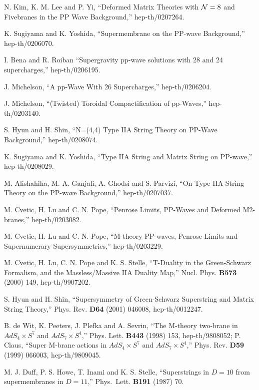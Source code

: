 \documentclass[a4paper,12pt]{article}
\begin{document}
\begin{thebibliography}{99}
 N. Kim, K. M. Lee and P. Yi, ``Deformed Matrix
  Theories with ${\cal N}=8$ and Fivebranes in the PP Wave
  Background,'' hep-th/0207264.

 K. Sugiyama and K. Yoshida, ``Supermembrane on the
  PP-wave Background,'' hep-th/0206070.

 I. Bena and R. Roiban ``Supergravity pp-wave
  solutions with 28 and 24 supercharges,'' hep-th/0206195.

 J. Michelson, ``A pp-Wave With 26 Supercharges,''
  hep-th/0206204.

 J. Michelson, ``(Twisted) Toroidal Compactification
  of pp-Waves,'' hep-th/0203140.
  
 S. Hyun and H. Shin, ``N=(4,4) Type IIA String Theory
  on PP-Wave Background,'' hep-th/0208074.

 K. Sugiyama and K. Yoshida, ``Type IIA String and
  Matrix String on PP-wave,'' hep-th/0208029.
  
 M. Alishahiha, M. A. Ganjali, A. Ghodsi and S.
  Parvizi, ``On Type IIA String Theory on the PP-wave Background,''
  hep-th/0207037.
 
 M. Cvetic, H. Lu and C. N. Pope, ``Penrose Limits,
  PP-Waves and Deformed M2-branes,'' hep-th/0203082.
  
 M. Cvetic, H. Lu and C. N. Pope, ``M-theory PP-waves,
  Penrose Limits and Supernumerary Supersymmetries,'' hep-th/0203229.

 M. Cvetic, H. Lu, C. N. Pope and K. S. Stelle,
  ``T-Duality in the Green-Schwarz Formalism, and the Massless/Massive
  IIA Duality Map,'' Nucl. Phys. {\bf B573} (2000) 149,
  hep-th/9907202.
  
 S. Hyun and H. Shin, ``Supersymmetry of Green-Schwarz
  Superstring and Matrix String Theory,'' Phys. Rev. {\bf D64} (2001)
  046008, hep-th/0012247.
  
 B. de Wit, K. Peeters, J. Plefka and A. Sevrin, ``The
  M-theory two-brane in $AdS_4 \times S^7$ and $AdS_7 \times S^4$,''
  Phys. Lett. {\bf B443} (1998) 153, hep-th/9808052; P. Claus, ``Super
  M-brane actions in $AdS_4 \times S^7$ and $AdS_7 \times S^4$,''
  Phys. Rev. {\bf D59} (1999) 066003, hep-th/9809045.

 M. J. Duff, P. S. Howe, T. Inami and K. S. Stelle,
  ``Superstrings in $D=10$ from supermembranes in $D=11$,''
  Phys.~Lett.  {\bf B191} (1987) 70.


\end{thebibliography}
\end{document}
